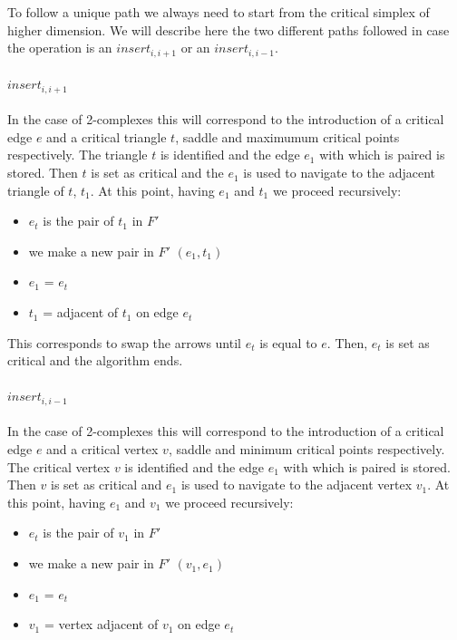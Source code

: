 \documentclass[preprint,5p,times,onecolumn]{article}
\begin{document}
To follow a unique path we always need to start from the critical simplex of higher dimension. We will describe here the two different paths followed in case the operation is an $insert_{i,i+1}$ or an $insert_{i,i-1}$.

\paragraph{$insert_{i,i+1}$} 
In the case of 2-complexes this will correspond to the introduction of a critical edge $e$ and a critical triangle $t$, saddle and maximumum critical points respectively. The triangle $t$ is identified and the edge $e_1$ with which is paired is stored. Then $t$ is set as critical and the $e_1$ is used to navigate to the adjacent triangle of $t$, $t_1$. At this point, having $e_1$ and $t_1$ we proceed recursively:

\begin{itemize}
	\item $e_t$ is the pair of $t_1$ in $F'$
	\item we make a new pair in $F'$ $(e_1,t_1)$
	\item $e_1$ = $e_t$
	\item $t_1$ = adjacent of $t_1$ on edge $e_t$ 
\end{itemize} 

This corresponds to swap the arrows until $e_t$ is equal to $e$. Then, $e_t$ is set as critical and the algorithm ends.


\paragraph{$insert_{i,i-1}$} 
In the case of 2-complexes this will correspond to the introduction of a critical edge $e$ and a critical vertex $v$, saddle and minimum critical points respectively. The critical vertex $v$ is identified and the edge $e_1$ with which is paired is stored. Then $v$ is set as critical and $e_1$ is used to navigate to the adjacent vertex $v_1$. At this point, having $e_1$ and $v_1$ we proceed recursively:

\begin{itemize}
	\item $e_t$ is the pair of $v_1$ in $F'$
	\item we make a new pair in $F'$ $(v_1,e_1)$
	\item $e_1$ = $e_t$
	\item $v_1$ = vertex adjacent of $v_1$ on edge $e_t$ 
\end{itemize} 
\end{document}
